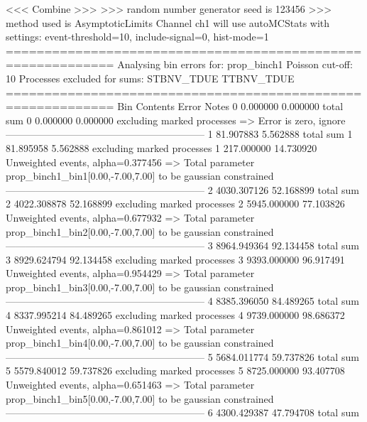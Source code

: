  <<< Combine >>> 
>>> random number generator seed is 123456
>>> method used is AsymptoticLimits
Channel ch1 will use autoMCStats with settings: event-threshold=10, include-signal=0, hist-mode=1
============================================================
Analysing bin errors for: prop_binch1
Poisson cut-off: 10
Processes excluded for sums: STBNV_TDUE TTBNV_TDUE
============================================================
Bin        Contents        Error           Notes                         
0          0.000000        0.000000        total sum                     
0          0.000000        0.000000        excluding marked processes    
  => Error is zero, ignore      
------------------------------------------------------------
1          81.907883       5.562888        total sum                     
1          81.895958       5.562888        excluding marked processes    
1          217.000000      14.730920       Unweighted events, alpha=0.377456
  => Total parameter prop_binch1_bin1[0.00,-7.00,7.00] to be gaussian constrained
------------------------------------------------------------
2          4030.307126     52.168899       total sum                     
2          4022.308878     52.168899       excluding marked processes    
2          5945.000000     77.103826       Unweighted events, alpha=0.677932
  => Total parameter prop_binch1_bin2[0.00,-7.00,7.00] to be gaussian constrained
------------------------------------------------------------
3          8964.949364     92.134458       total sum                     
3          8929.624794     92.134458       excluding marked processes    
3          9393.000000     96.917491       Unweighted events, alpha=0.954429
  => Total parameter prop_binch1_bin3[0.00,-7.00,7.00] to be gaussian constrained
------------------------------------------------------------
4          8385.396050     84.489265       total sum                     
4          8337.995214     84.489265       excluding marked processes    
4          9739.000000     98.686372       Unweighted events, alpha=0.861012
  => Total parameter prop_binch1_bin4[0.00,-7.00,7.00] to be gaussian constrained
------------------------------------------------------------
5          5684.011774     59.737826       total sum                     
5          5579.840012     59.737826       excluding marked processes    
5          8725.000000     93.407708       Unweighted events, alpha=0.651463
  => Total parameter prop_binch1_bin5[0.00,-7.00,7.00] to be gaussian constrained
------------------------------------------------------------
6          4300.429387     47.794708       total sum                     
